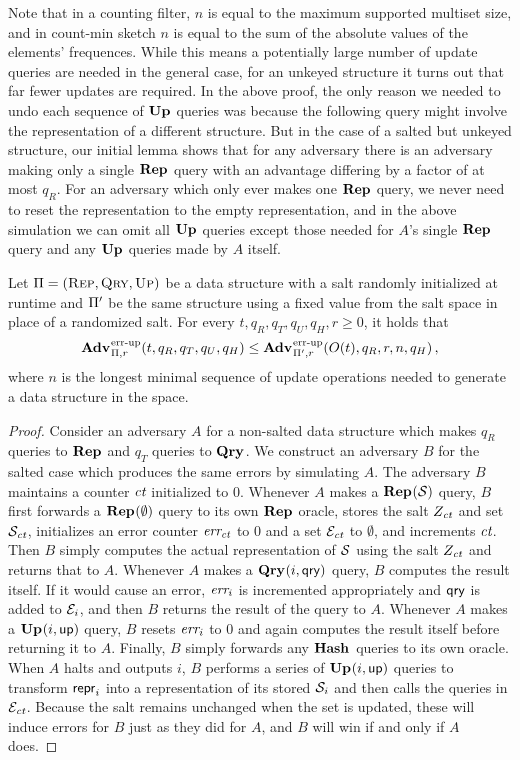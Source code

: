 Note that in a counting filter, $n$ is equal to the maximum supported multiset size, and in count-min sketch $n$ is equal to the sum of the absolute values of the elements' frequences. While this means a potentially large number of update queries are needed in the general case, for an unkeyed structure it turns out that far fewer updates are required. In the above proof, the only reason we needed to undo each sequence of $\mathbf{Up}\hspace{0.5pt}$ queries was because the following query might involve the representation of a different structure. But in the case of a salted but unkeyed structure, our initial lemma shows that for any adversary there is an adversary making only a single $\mathbf{Rep}\hspace{0.5pt}$ query with an advantage differing by a factor of at most $q_R$. For an adversary which only ever makes one $\mathbf{Rep}\hspace{0.5pt}$ query, we never need to reset the representation to the empty representation, and in the above simulation we can omit all $\mathbf{Up}\hspace{0.5pt}$ queries except those needed for $A$'s single $\mathbf{Rep}\hspace{0.5pt}$ query and any $\mathbf{Up}\hspace{0.5pt}$ queries made by $A$ itself.

\begin{lemma}\label{lemma:nosalt}
  Let $\mathrm{\Pi} = (\textsc{Rep}, \textsc{Qry}, \textsc{Up})$ be a data structure with a salt randomly initialized at runtime and $\mathrm{\Pi}'$ be the same structure using a fixed value from the salt space in place of a randomized salt. For every $t, q_R, q_T, q_U, q_H, r\geq 0$, it holds that
  \[
    \Adv{\errep}_{\struct,r}(t, q_R, q_T, q_U, q_H) \leq
    \Adv{\errep}_{\struct',r}(O(t), q_R, r, n, q_H) \,,
  \]
  where $n$ is the longest minimal sequence of update operations needed to generate a data structure in the space.
\end{lemma}
\begin{proof}
Consider an adversary $A$ for a non-salted data structure which makes $q_R$ queries to $\mathbf{Rep}\hspace{0.5pt}$ and $q_T$ queries to $\mathbf{Qry}\hspace{0.5pt}$. We construct an adversary $B$ for the salted case which produces the same errors by simulating $A$. The adversary $B$ maintains a counter $\textit{ct}$ initialized to 0. Whenever $A$ makes a $\mathbf{Rep}\hspace{0.5pt}(\mathcal{S})$ query, $B$ first forwards a $\mathbf{Rep}\hspace{0.5pt}(\emptyset)$ query to its own $\mathbf{Rep}\hspace{0.5pt}$ oracle, stores the salt $Z_{\textit{ct}}$ and set $\mathcal{S}_{\textit{ct}}$, initializes an error counter $\textit{err}_{\textit{ct}}$ to 0 and a set $\mathcal{E}_{\textit{ct}}$ to $\emptyset$, and increments $\textit{ct}$. Then $B$ simply computes the actual representation of $\mathcal{S}$ using the salt $Z_{\textit{ct}}$ and returns that to $A$. Whenever $A$ makes a $\mathbf{Qry}\hspace{0.5pt}(i,\mathsf{qry})$ query, $B$ computes the result itself. If it would cause an error, $\textit{err}_i$ is incremented appropriately and $\mathsf{qry}$ is added to $\mathcal{E}_i$, and then $B$ returns the result of the query to $A$. Whenever $A$ makes a $\mathbf{Up}\hspace{0.5pt}(i, \mathsf{up})$ query, $B$ resets $\textit{err}_i$ to 0 and again computes the result itself before returning it to $A$. Finally, $B$ simply forwards any $\mathbf{Hash}\hspace{0.5pt}$ queries to its own oracle. When $A$ halts and outputs $i$, $B$ performs a series of $\mathbf{Up}\hspace{0.5pt}(i, \mathsf{up})$ queries to transform $\mathsf{repr}_i$ into a representation of its stored $\mathcal{S}_i$ and then calls the queries in $\mathcal{E}_{\textit{ct}}$. Because the salt remains unchanged when the set is updated, these will induce errors for $B$ just as they did for $A$, and $B$ will win if and only if $A$ does.
\end{proof}

